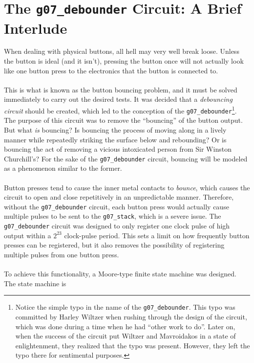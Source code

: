 \documentclass[12pt]{report}
\begin{document}
\section*{The \texttt{g07\_debounder} Circuit: A Brief Interlude}
When dealing with physical buttons, all hell may very well break loose. Unless the button is ideal
(and it isn't), pressing the button once will not actually look like one button press to the
electronics that the button is connected to.\\\\
This is what is known as the button bouncing problem, and it must be solved immediately to carry out
the desired tests. It was decided that a \textit{debouncing circuit} should be created, which led to
the conception of the \texttt{g07\_debounder}\footnote{Notice the simple typo in the name of the
	\texttt{g07\_debounder}. This typo was committed by Harley Wiltzer when rushing through the
	design of the circuit, which was done during a time when he had ``other work to do''. Later on,
	when the success of the circuit put Wiltzer and Mavroidakos in a state of enlightenment, they
realized that the typo was present. However, they left the typo there for sentimental purposes.}.
The purpose of this circuit was to remove the
``bouncing'' of the button output. But what \textit{is} bouncing? Is bouncing the process of moving
along in a lively manner while repeatedly striking the surface below and rebounding? Or is bouncing
the act of removing a vicious intoxicated person from Sir Winston Churchill's? For the sake of the
\texttt{g07\_debounder} circuit, bouncing will be modeled as a phenomenon similar to the former.\\\\
Button presses tend to cause the inner metal contacts to \textit{bounce}, which causes the circuit
to open and close repetitively in an unpredictable manner. Therefore, without the
\texttt{g07\_debounder} circuit, each button press would actually cause multiple pulses to be sent
to the \texttt{g07\_stack}, which is a severe issue. The \texttt{g07\_debounder} circuit was
designed to only register one clock pulse of high output within a $2^{23}$ clock-pulse period. This
sets a limit on how frequently button presses can be registered, but it also removes the possibility
of registering multiple pulses from one button press.\\\\
To achieve this functionality, a Moore-type finite state machine was designed. The state machine is
\end{document}
